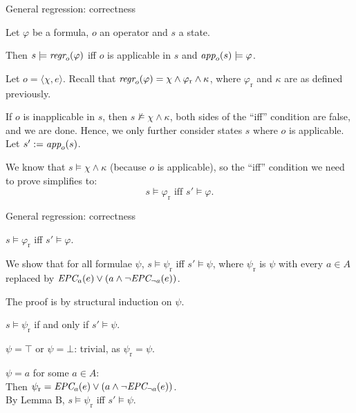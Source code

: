 \documentclass{gkibeamer}
\begin{document}
\begin{frame}{General regression: correctness}
  \begin{theorem}
    Let $\varphi$ be a formula,
    $o$ an operator and
    $s$ a state.

    Then $s \models \textit{regr}_{o}(\varphi)$
    iff $o$ is applicable in $s$ and $\textit{app}_{o}(s) \models \varphi$.
  \end{theorem}
  \pause

  \begin{proofstart}
    Let $o = \langle \chi, e\rangle$. Recall that $\textit{regr}_{o}(\varphi) =
    \chi \land \varphi_{\text{r}} \land \kappa$, where
    $\varphi_{\text{r}}$ and $\kappa$ are as defined previously.

    \medskip
    \pause

    If $o$ is inapplicable in $s$, then $s \not\models \chi \land
    \kappa$, both sides of the ``iff'' condition are false, and we are
    done. Hence, we only further consider states $s$ where $o$ is
    applicable. Let $s' := \textit{app}_{o}(s)$.

    \medskip
    \pause

    We know that $s \models \chi \land \kappa$ (because $o$ is
    applicable), so the ``iff'' condition we need to prove simplifies
    to:
    \[s \models \varphi_{\text{r}} \text{~iff~} s' \models \varphi.\]
  \end{proofstart}
\end{frame}

\begin{frame}{General regression: correctness}
  \begin{proofmid}
     $s \models \varphi_{\text{r}}$
    iff $s' \models \varphi$.

    \medskip
    \pause

    We show that for all formulae $\psi$, $s \models \psi_{\text{r}}$
    iff $s' \models \psi$, where $\psi_{\text{r}}$ is $\psi$ with
    every $a \in A$ replaced by $\textit{EPC}_{a}(e) \lor (a \land \neg
    \textit{EPC}_{\neg a}(e))$.

    \pause
    \medskip

    The proof is by structural induction on $\psi$.

    \begin{description}
    \item[Induction hypothesis]
      $s \models \psi_{\text{r}}$ if and only if $s' \models \psi$.
      \pause
    \item[Base cases 1 \& 2] $\psi = \top$ or $\psi = \bot$:
      trivial, as $\psi_{\text{r}} = \psi$.
      \pause
    \item[Base case 3] $\psi = a$ for some $a \in A$: \\
      Then $\psi_{\text{r}} = \textit{EPC}_{a}(e) \lor
      (a \land \neg \textit{EPC}_{\neg a}(e))$. \\
      By Lemma B, $s \models \psi_{\text{r}}$ iff $s' \models \psi$.
    \end{description}
  \end{proofmid}
\end{frame}
\end{document}
